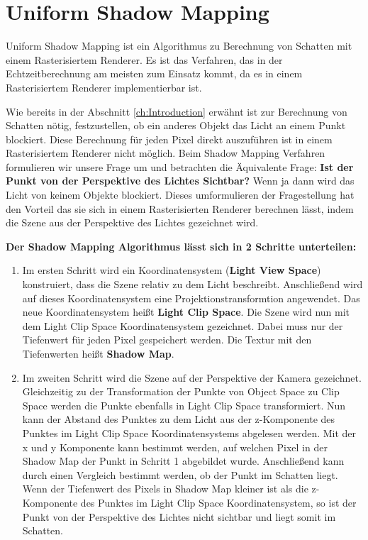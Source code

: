 \section{Uniform Shadow Mapping}
\label{section:uniform-shadow-mapping}
Uniform Shadow Mapping \cite{Williams1978} ist ein Algorithmus zu Berechnung von Schatten 
mit einem Rasterisiertem Renderer. 
Es ist das Verfahren, das in der Echtzeitberechnung am meisten zum Einsatz kommt, 
da es in einem Rasterisiertem Renderer implementierbar ist.
\par
Wie bereits in der Abschnitt \ref{ch:Introduction} erwähnt ist zur Berechnung von Schatten nötig, festzustellen,
ob ein anderes Objekt das Licht an einem Punkt blockiert.
Diese Berechnung für jeden Pixel direkt auszuführen ist in einem Rasterisiertem 
Renderer nicht möglich.
Beim Shadow Mapping Verfahren formulieren wir unsere Frage um und betrachten 
die Äquivalente Frage:
\textbf{Ist der Punkt von der Perspektive des Lichtes Sichtbar?}
Wenn ja dann wird das Licht von keinem Objekte blockiert.
Dieses umformulieren der Fragestellung hat den Vorteil das sie sich in
einem Rasterisierten Renderer berechnen lässt, indem die Szene aus der Perspektive des Lichtes gezeichnet wird.
\par
\textbf{Der Shadow Mapping Algorithmus lässt sich in 2 Schritte 
unterteilen:}
\begin{enumerate}
  \item Im ersten Schritt wird ein Koordinatensystem (\textbf{Light View Space}) konstruiert, 
    dass die Szene relativ zu dem Licht beschreibt.
    Anschließend wird auf dieses Koordinatensystem eine Projektionstransformtion angewendet.
    Das neue Koordinatensystem heißt \textbf{Light Clip Space}.
    Die Szene wird nun mit dem Light Clip Space Koordinatensystem gezeichnet.
    Dabei muss nur der Tiefenwert für jeden Pixel gespeichert werden.
    Die Textur mit den Tiefenwerten heißt \textbf{Shadow Map}.
  \item Im zweiten Schritt wird die Szene auf der Perspektive der Kamera gezeichnet.
    Gleichzeitig zu der Transformation der Punkte von Object Space zu Clip Space
    werden die Punkte ebenfalls in Light Clip Space transformiert.
    Nun kann der Abstand des Punktes zu dem Licht 
    aus der z-Komponente des Punktes im Light Clip Space Koordinatensystems abgelesen werden.
    Mit der x und y Komponente kann bestimmt werden, auf welchen Pixel in der Shadow Map der Punkt in Schritt 1 abgebildet wurde.
    Anschließend kann durch einen Vergleich bestimmt werden, ob der Punkt im Schatten liegt.
    Wenn der Tiefenwert des Pixels in Shadow Map kleiner ist als die z-Komponente des Punktes im Light Clip Space Koordinatensystem,
    so ist der Punkt von der Perspektive des Lichtes nicht sichtbar und liegt somit im Schatten.
\end{enumerate}
